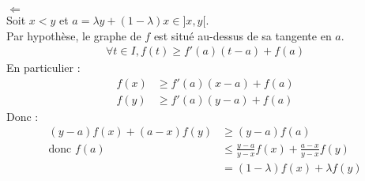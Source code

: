 \documentclass[../main.tex]{subfiles}
\begin{document}
$\boxed{\Leftarrow}$ \\
Soit $x < y$ et $a = \lambda y + (1-\lambda)x \in ]x, y[$. \\
Par hypothèse, le graphe de $f$ est situé au-dessus de sa tangente en $a$. 
\begin{align*}
    \forall t \in I, f(t) \geq f'(a)(t-a) + f(a)
\end{align*}
En particulier :
\begin{align*}
    f(x) &\geq f'(a)(x-a) + f(a) \\
    f(y) &\geq f'(a)(y-a) + f(a)
\end{align*}
Donc : 
\begin{align*}
    (y-a)f(x) + (a-x)f(y) &\geq (y-a)f(a) \\
    \text{donc } f(a) &\leq \frac{y-a}{y-x}f(x) + \frac{a-x}{y-x}f(y) \\
    &= (1-\lambda)f(x) + \lambda f(y)
\end{align*}
\end{document}
